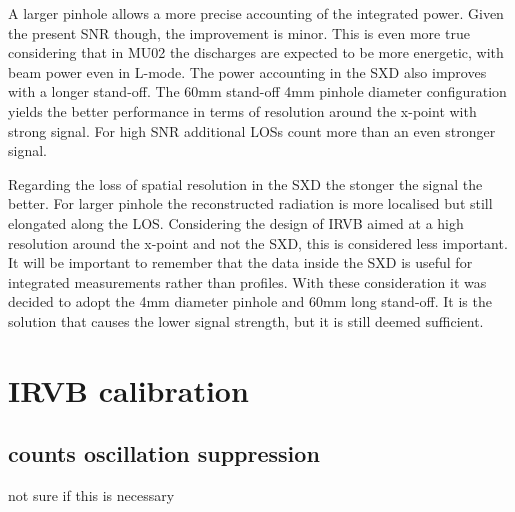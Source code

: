 A larger pinhole allows a more precise accounting of the integrated power. Given the present SNR though, the improvement is minor. This is even more true considering that in MU02 the discharges are expected to be more energetic, with beam power even in L-mode. The power accounting in the SXD also improves with a longer stand-off.
The 60mm stand-off 4mm pinhole diameter configuration yields the better performance in terms of resolution around the x-point with strong signal. For high SNR additional LOSs count more than an even stronger signal.

Regarding the loss of spatial resolution in the SXD the stonger the signal the better. For larger pinhole the reconstructed radiation is more localised but still elongated along the LOS. Considering the design of IRVB aimed at a high resolution around the x-point and not the SXD, this is considered less important. It will be important to remember that the data inside the SXD is useful for integrated measurements rather than profiles.
With these consideration it was decided to adopt the 4mm diameter pinhole and 60mm long stand-off. It is the solution that causes the lower signal strength, but it is still deemed sufficient.

\section{IRVB calibration}\label{IRVBcalibration}


\subsection{counts oscillation suppression}
not sure if this is necessary
